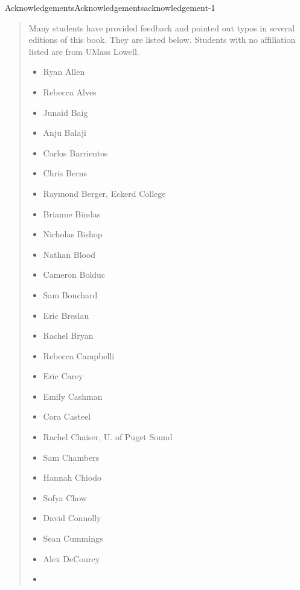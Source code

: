 \documentclass[twoside,10pt,]{book}
\numberwithin{equation}{section}
\begin{document}
\begin{acknowledgement}{Acknowledgements}{}{Acknowledgements}{}{}{acknowledgement-1}
\begin{quote}\hypertarget{blockquote-2}{}
\hypertarget{p-15}{}%
Many students have provided feedback and pointed out typos in several editions of this book. They are listed below. Students with no affiliation listed are from UMass Lowell.\leavevmode%
\begin{multicols}{2}
\begin{itemize}[label=\textbullet]
\item{}\hypertarget{p-16}{}%
Ryan Allen%
\item{}\hypertarget{p-17}{}%
Rebecca Alves%
\item{}\hypertarget{p-18}{}%
Junaid Baig%
\item{}\hypertarget{p-19}{}%
Anju Balaji%
\item{}\hypertarget{p-20}{}%
Carlos Barrientos%
\item{}\hypertarget{p-21}{}%
Chris Berns%
\item{}\hypertarget{p-22}{}%
Raymond Berger, Eckerd College%
\item{}\hypertarget{p-23}{}%
Brianne Bindas%
\item{}\hypertarget{p-24}{}%
Nicholas Bishop%
\item{}\hypertarget{p-25}{}%
Nathan Blood%
\item{}\hypertarget{p-26}{}%
Cameron Bolduc%
\item{}\hypertarget{p-27}{}%
Sam Bouchard%
\item{}\hypertarget{p-28}{}%
Eric Breslau%
\item{}\hypertarget{p-29}{}%
Rachel Bryan%
\item{}\hypertarget{p-30}{}%
Rebecca Campbelli%
\item{}\hypertarget{p-31}{}%
Eric Carey%
\item{}\hypertarget{p-32}{}%
Emily Cashman%
\item{}\hypertarget{p-33}{}%
Cora Casteel%
\item{}\hypertarget{p-34}{}%
Rachel Chaiser, U. of Puget Sound%
\item{}\hypertarget{p-35}{}%
Sam Chambers%
\item{}\hypertarget{p-36}{}%
Hannah Chiodo%
\item{}\hypertarget{p-37}{}%
Sofya Chow%
\item{}\hypertarget{p-38}{}%
David Connolly%
\item{}\hypertarget{p-39}{}%
Sean Cummings%
\item{}\hypertarget{p-40}{}%
Alex DeCourcy%
\item{}\hypertarget{p-41}{}%

\end{itemize}
\end{multicols}
\end{quote}
\end{acknowledgement}
\end{document}
